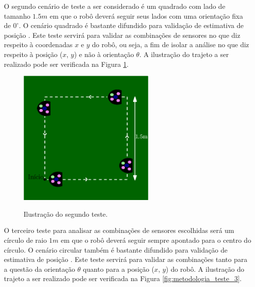 \documentclass[acronym, symbols, table]{fei}
\begin{document}
		O segundo cenário de teste a ser considerado é um quadrado com lado de tamanho $1.5m$ em que o robô deverá seguir seus lados com uma orientação fixa de $0^\circ$. O cenário quadrado é bastante difundido para validação de estimativa de posição \cites{rostami2018localization}{gonccalves2008real}{santini1997trajectory}. Este teste servirá para validar as combinações de sensores no que diz respeito à coordenadas $x$ e $y$ do robô, ou seja, a fim de isolar a análise no que diz respeito à posição ($x$, $y$) e não à orientação $\theta$. A ilustração do trajeto a ser realizado pode ser verificada na Figura \ref{fig:metodologia_teste_2}.
		
		\begin{figure}[!htb]
			\centering
			\caption{Ilustração do segundo teste.}
			\includegraphics[width=0.6\textwidth]{teste_2.eps}
			\label{fig:metodologia_teste_2}
		\end{figure}
		
		O terceiro teste para analisar as combinações de sensores escolhidas será um círculo de raio $1m$ em que o robô deverá seguir sempre apontado para o centro do círculo. O cenário circular também é bastante difundido para validação de estimativa de posição \cites{suliman2009mobile}{marton2013two}{rigatos2010extended}{eman2020mobile}. Este teste servirá para validar as combinações tanto para a questão da orientação $\theta$ quanto para a posição ($x$, $y$) do robô. A ilustração do trajeto a ser realizado pode ser verificada na Figura \ref{fig:metodologia_teste_3}.
		
\end{document}
